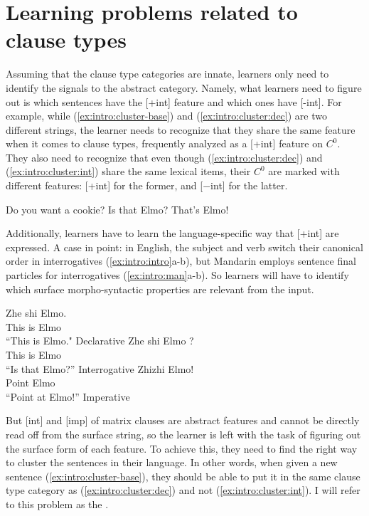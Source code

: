 {\section{Learning problems related to clause types}


Assuming that the clause type categories are innate, learners only need to identify the signals to the abstract category. Namely, what learners need to figure out is which sentences have the [+int] feature and which ones have [-int]. 
For example, while (\ref{ex:intro:cluster-base}) and (\ref{ex:intro:cluster:dec}) are two different strings, the learner needs to recognize that they share the same feature when it comes to clause types, frequently analyzed as a [+int] feature on $C^{0}$. They also need to recognize that even though (\ref{ex:intro:cluster:dec}) and (\ref{ex:intro:cluster:int}) share the same lexical items, their $C^{0}$ are marked with different features: [+int] for the former, and [$-$int] for the latter.


Do you want a cookie?
\eex
{}
\bxl\label{ex:intro:cluster:int}
Is that Elmo?
\ex\label{ex:intro:cluster:dec}
That’s Elmo!
\exl
\eex


Additionally, learners have to learn the language-specific way that [+int] are expressed. A case in point: in English, the subject and verb switch their canonical order in interrogatives (\ref{ex:intro:intro}a-b), but Mandarin employs sentence final particles for interrogatives (\ref{ex:intro:man}a-b). So learners will have to identify which surface morpho-syntactic properties are relevant from the input.  


\bxl
\gll Zhe shi Elmo.\\
This is Elmo\\
\trans ``This is Elmo." \hfill Declarative
\ex 
\gll Zhe shi Elmo ?\\
This is Elmo \Sfp\\
\trans ``Is that Elmo?'' \hfill Interrogative
\ex 
\gll Zhizhi Elmo!\\
Point Elmo\\
\trans ``Point at Elmo!'' \hfill Imperative
\exl
\eex


But [\textpm int] and [imp] of matrix clauses are abstract features and cannot be directly read off from the surface string, so the learner is left with the task of figuring out the surface form of each feature. To achieve this, they need to find the right way to cluster the sentences in their language. In other words, when given a new sentence (\ref{ex:intro:cluster-base}), they should be able to put it in the same clause type category as (\ref{ex:intro:cluster:dec}) and not (\ref{ex:intro:cluster:int}). I will refer to this problem as the . 

}
